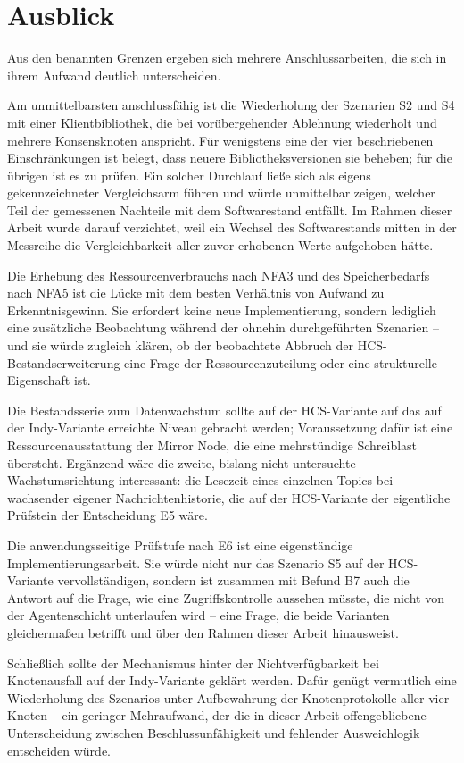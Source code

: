 \section{Ausblick}
\label{sec:discussion-ausblick}

Aus den benannten Grenzen ergeben sich mehrere Anschlussarbeiten, die sich in ihrem Aufwand deutlich unterscheiden.

Am unmittelbarsten anschlussfähig ist die Wiederholung der Szenarien S2 und S4 mit einer Klientbibliothek, die bei vorübergehender Ablehnung wiederholt und mehrere Konsensknoten anspricht. Für wenigstens eine der vier beschriebenen Einschränkungen ist belegt, dass neuere Bibliotheksversionen sie beheben; für die übrigen ist es zu prüfen. Ein solcher Durchlauf ließe sich als eigens gekennzeichneter Vergleichsarm führen und würde unmittelbar zeigen, welcher Teil der gemessenen Nachteile mit dem Softwarestand entfällt. Im Rahmen dieser Arbeit wurde darauf verzichtet, weil ein Wechsel des Softwarestands mitten in der Messreihe die Vergleichbarkeit aller zuvor erhobenen Werte aufgehoben hätte.

Die Erhebung des Ressourcenverbrauchs nach NFA3 und des Speicherbedarfs nach NFA5 ist die Lücke mit dem besten Verhältnis von Aufwand zu Erkenntnisgewinn. Sie erfordert keine neue Implementierung, sondern lediglich eine zusätzliche Beobachtung während der ohnehin durchgeführten Szenarien -- und sie würde zugleich klären, ob der beobachtete Abbruch der HCS-Bestandserweiterung eine Frage der Ressourcenzuteilung oder eine strukturelle Eigenschaft ist.

Die Bestandsserie zum Datenwachstum sollte auf der HCS-Variante auf das auf der Indy-Variante erreichte Niveau gebracht werden; Voraussetzung dafür ist eine Ressourcenausstattung der Mirror Node, die eine mehrstündige Schreiblast übersteht. Ergänzend wäre die zweite, bislang nicht untersuchte Wachstumsrichtung interessant: die Lesezeit eines einzelnen Topics bei wachsender eigener Nachrichtenhistorie, die auf der HCS-Variante der eigentliche Prüfstein der Entscheidung E5 wäre.

Die anwendungsseitige Prüfstufe nach E6 ist eine eigenständige Implementierungsarbeit. Sie würde nicht nur das Szenario S5 auf der HCS-Variante vervollständigen, sondern ist zusammen mit Befund B7 auch die Antwort auf die Frage, wie eine Zugriffskontrolle aussehen müsste, die nicht von der Agentenschicht unterlaufen wird -- eine Frage, die beide Varianten gleichermaßen betrifft und über den Rahmen dieser Arbeit hinausweist.

Schließlich sollte der Mechanismus hinter der Nichtverfügbarkeit bei Knotenausfall auf der Indy-Variante geklärt werden. Dafür genügt vermutlich eine Wiederholung des Szenarios unter Aufbewahrung der Knotenprotokolle aller vier Knoten -- ein geringer Mehraufwand, der die in dieser Arbeit offengebliebene Unterscheidung zwischen Beschlussunfähigkeit und fehlender Ausweichlogik entscheiden würde.